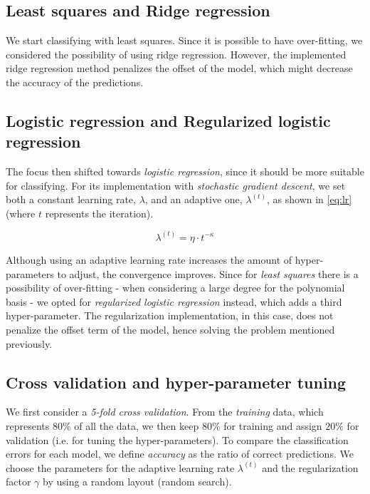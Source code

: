 \documentclass[10pt,conference,compsocconf]{IEEEtran}
\begin{document}
	\subsection{Least squares and Ridge regression} %
	\label{sub:least_squares_and_ridge_regression}
  	We start classifying with least squares. Since it is possible to have over-fitting, we considered the possibility of using ridge regression. However, the implemented ridge regression method penalizes the offset of the model, which might decrease the accuracy of the predictions.

	\subsection{Logistic regression and Regularized logistic regression} %
	\label{sub:logistic_regression_and_regularized_logistic_regression}
  	The focus then shifted towards \textit{logistic regression}, since it should be more suitable for classifying. For its implementation with \textit{stochastic gradient descent}, we set both a constant learning rate, $\lambda$, and an adaptive one, $\lambda^{(t)}$, as shown in \ref{eq:lr} (where $t$ represents the iteration).

  	\begin{equation}
    	\label{eq:lr}
      	\lambda^{(t)} = \eta \cdot t ^{- \kappa}
  	\end{equation}

  	Although using an adaptive learning rate increases the amount of hyper-parameters to adjust, the convergence improves.
  	Since for \textit{least squares} there is a possibility of over-fitting - when considering a large degree for the polynomial basis - we opted for \textit{regularized logistic regression} instead, which adds a third hyper-parameter. The regularization implementation, in this case, does not penalize the offset term of the model, hence solving the problem mentioned previously.

	\subsection{Cross validation and hyper-parameter tuning} %
	\label{sub:cross_validation_and_hyperparameters_tuning}
  	We first consider a \textit{5-fold cross validation}. From the \emph{training} data, which represents $80\%$ of all the data, we then keep $80\%$ for training and assign $20\%$ for validation (i.e. for tuning the hyper-parameters). To compare the classification errors for each model, we define \emph{accuracy} as the ratio of correct predictions.	We choose the parameters for the adaptive learning rate $\lambda^{(t)}$ and the regularization factor $\gamma$ by using a random layout (random search).
\end{document}
